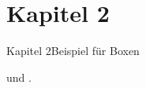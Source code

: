 
\if{}\section{Kapitel 2}\fi

\begin{frame}[label={kapitel2]{Kapitel 2}{Beispiel für Boxen}
    \begin{itemize}
       \inlinebox{} und \inlinebox*{}.
    \end{itemize}
\end{frame}
